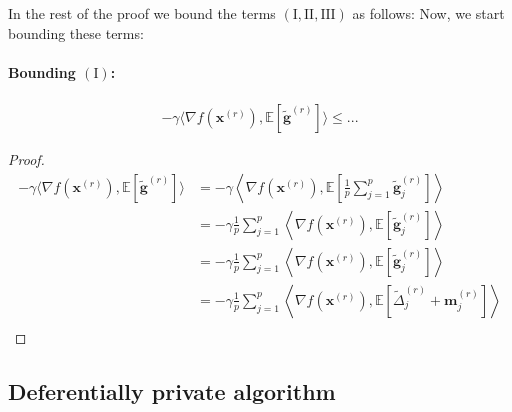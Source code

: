 In the rest of the proof we bound the terms $(\mathrm{I},\mathrm{II},\mathrm{III})$ as follows:
Now, we start bounding these terms:

\paragraph{Bounding $(\mathrm{I})$:}
\begin{lemma}
\begin{align}
    -\gamma \big\langle\nabla f({\boldsymbol{x}}^{(r)}),\mathbb{E}\left[\tilde{\mathbf{g}}^{(r)}\right]\big\rangle\leq ...
\end{align}
\end{lemma}
\begin{proof}
\begin{align}
    -\gamma \big\langle\nabla f({\boldsymbol{x}}^{(r)}),\mathbb{E}\left[\tilde{\mathbf{g}}^{(r)}\right]\big\rangle&=-\gamma \left\langle\nabla f({\boldsymbol{x}}^{(r)}),\mathbb{E}\left[\frac{1}{p}\sum_{j=1}^p\tilde{\mathbf{g}}_j^{(r)}\right]\right\rangle\nonumber\\
    &=-\gamma\frac{1}{p}\sum_{j=1}^p \left\langle\nabla f({\boldsymbol{x}}^{(r)}),\mathbb{E}\left[\tilde{\mathbf{g}}_j^{(r)}\right]\right\rangle\nonumber\\
    &=-\gamma\frac{1}{p}\sum_{j=1}^p \left\langle\nabla f({\boldsymbol{x}}^{(r)}),\mathbb{E}\left[\tilde{\mathbf{g}}_j^{(r)}\right]\right\rangle\nonumber\\
    &=-\gamma\frac{1}{p}\sum_{j=1}^p \left\langle\nabla f({\boldsymbol{x}}^{(r)}),\mathbb{E}\left[\tilde{\Delta}_j^{(r)}+\mathbf{m}_j^{(r)}\right]\right\rangle\nonumber\\
\end{align}
\end{proof}


\subsection{Deferentially private algorithm}








